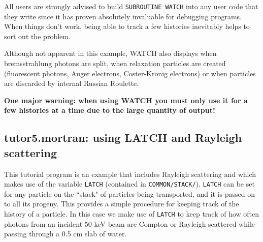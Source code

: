 All users are strongly advised to build {\tt SUBROUTINE WATCH} into any
user code that they write since it has proven absolutely invaluable for
debugging programs.  When things don't work, being able to track a few
histories inevitably helps to sort out the problem.

Although not apparent in this example, WATCH also displays when
bremsstrahlung photons are split, when relaxation particles are created
(fluorescent photons, Auger electrons, Coster-Kronig electrons) or when
particles are discarded by internal Russian Roulette.

{\bfseries One major warning: when using WATCH you must only use it for a
few histories at a time due to the large quantity of output!}



\begin{latexonly}




\clearpage
\end{latexonly}

\begin{htmlonly}
\clearpage

\clearpage

\clearpage

\clearpage

\clearpage
\end{htmlonly}




\subsection{tutor5.mortran: using LATCH and Rayleigh scattering}
%
This tutorial program is an example that includes Rayleigh scattering
and which makes use of the variable {\tt LATCH} (contained in
{\tt COMMON/STACK/}).
{\tt LATCH} can be set for any particle on the ``stack" of particles being
transported, and it is passed on to all its progeny.  This provides a
simple procedure for keeping track of the history of a particle.  In
this case we make use of {\tt LATCH} to keep track of how often photons
from an incident 50 keV beam are Compton or Rayleigh scattered while
passing through a 0.5 cm slab of water.

